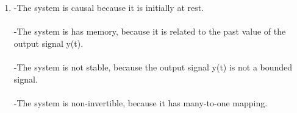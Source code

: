 \documentclass[10pt,a4paper, margin=1in]{article}
\begin{document}
\begin{enumerate}
\begin{enumerate}
   
   
   
   
  

    
    
    \item %
        -The system is causal because it is initially at rest. \\\\
        -The system is has memory, because it is related to the past value of the output signal y(t).\\\\
        -The system is not stable, because the output signal y(t) is not a bounded signal.\\\\
        -The system is non-invertible, because it has many-to-one mapping.
    
 

    \end{enumerate}
  






\newpage


\end{enumerate}
\end{document}
